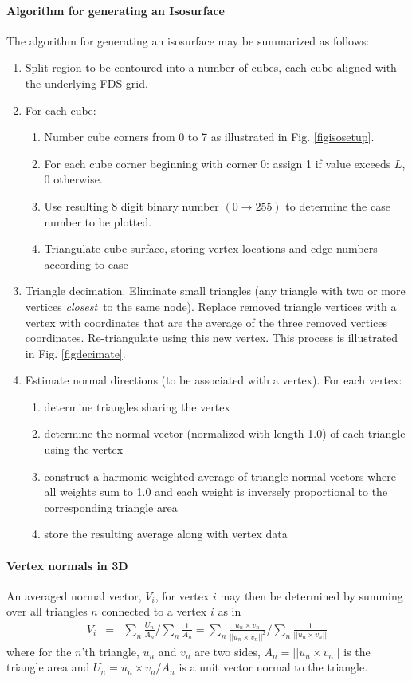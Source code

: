 \documentclass[11pt,twoside]{book}
\begin{document}
\paragraph{Algorithm for generating an Isosurface} The algorithm for
generating an isosurface may be summarized as follows:
\begin{enumerate}
\item Split region to be contoured into a number of cubes, each cube
aligned with the underlying FDS grid.
\item For  each cube:
\begin{enumerate}
\item Number cube corners from 0 to 7 as illustrated in Fig.
\ref{figisosetup}. \item For each cube corner beginning with
corner 0: assign 1 if value exceeds $L$, 0 otherwise. \item Use
resulting 8 digit binary number $(0\rightarrow 255)$ to determine
the case number to be plotted. \item Triangulate cube surface,
storing vertex locations and edge numbers according to case
\end{enumerate}
\item Triangle decimation.  Eliminate small triangles (any
triangle with two or more vertices {\em closest}\ to the same
node). Replace removed triangle vertices with a vertex with
coordinates that are the average of the three removed vertices
coordinates.  Re-triangulate using this new vertex.  This process
is illustrated in Fig. \ref{figdecimate}. \item Estimate normal
directions (to be associated with a vertex).  For each vertex:
\begin{enumerate}
\item determine triangles sharing the vertex
\item determine the normal vector (normalized with length 1.0) of each
triangle using the vertex
\item construct a harmonic weighted average of triangle normal vectors
where all weights sum to 1.0 and each weight is inversely proportional
to the corresponding triangle area
\item store the resulting average along with vertex data
\end{enumerate}
\end{enumerate}

\paragraph{Vertex normals in 3D} An averaged normal vector, $V_i$, for
vertex $i$ may then be determined by summing over all triangles $n$
connected to a vertex $i$ as in
\begin{eqnarray}
V_{i}&=&\sum_n\frac{U_n}{A_n}/\sum_n\frac{1}{A_n}
=\sum_n\frac{u_n\times v_n}{||u_n\times
v_n||^2}/\sum_n\frac{1}{||u_n\times v_n||}
\end{eqnarray}
where for the $n$'th triangle, $u_n$ and $v_n$ are two sides,
$A_n=||u_n\times v_n||$ is the triangle area and $U_n=u_n\times v_n/A_n$
is a unit vector normal to the triangle.
\end{document}
